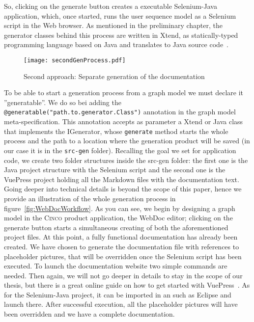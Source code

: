 So, clicking on the generate button creates a executable Selenium-Java application, which, once started, runs the user sequence model  as a Selenium script in the Web browser. As mentioned in the preliminary chapter, the generator classes behind this process are written in Xtend, as statically-typed programming language based on Java and translates to Java source code~\cite{Xtend}. 

\begin{figure}[h]
    \centering
    \texttt{[image: secondGenProcess.pdf]}
    \caption{Second approach: Separate generation of the documentation}
    \label{fig:secondGenProcess}
\end{figure}

To be able to start a generation process from a graph model we must declare it ''generatable''. We do so bei adding the \lstinline[language=MGL]{@generatable("path.to.generator.Class")} annotation in the graph model meta-specification. This annotation accepts as parameter a Xtend or Java class that implements the IGenerator, whose \lstinline{generate} method starts the whole process and the path to a location where the generation product will be saved (in our case it is in the \lstinline{src-gen} folder). Recalling the goal we set for application code, we create two folder structures inside the src-gen folder: the first one is the Java project structure with the Selenium script and the second one is the VuePress project holding all the Markdown files with the documentation text. Going deeper into technical details is beyond the scope of this paper, hence we provide an illustration of the whole generation process in figure~\ref{fig:WebDocWorkflow}. As you can see, we begin by designing a graph model in the \textsc{Cinco} product application, the WebDoc editor; clicking on the generate button starts a simultaneous creating of both the aforementioned project files. At this point, a fully functional documentation has already been created. We have chosen to generate the documentation file with references to placeholder pictures, that will be overridden once the Selenium script has been executed. To launch the documentation website two simple commands are needed. Then again, we will not go deeper in details to stay in the scope of our thesis, but there is a great online guide on how to get started with VuePress~\cite{vuepress}. As for the Selenium-Java project, it can be imported in an  such as Eclipse and launch there. After successful execution, all the placeholder pictures will have been overridden and we have a complete documentation.